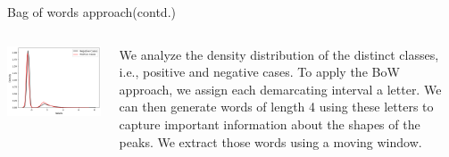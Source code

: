 \begin{frame}{Bag of words approach(contd.)}
\begin{columns}[T]
    \begin{column}{0.6\textwidth}
      \includegraphics[width=\textwidth]{images/density.png}
    \end{column}
    \begin{column}{0.45\textwidth}
    We analyze the density distribution of the distinct classes, i.e., positive and negative cases. To apply the BoW approach, we assign each demarcating interval a letter. We can then generate words of length 4 using these letters to capture important information about the shapes of the peaks. We extract those words using a moving window.
    \end{column}
  \end{columns}
\end{frame}


